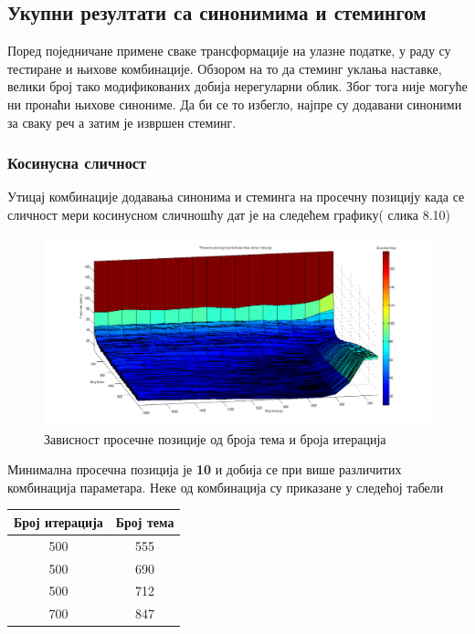 \subsection{Укупни резултати са синонимима и стемингом}

Поред поједничане примене сваке трансформације на улазне податке, у раду су тестиране и њихове комбинације. Обзором на то да стеминг уклања наставке, велики број тако модификованих добија нерегуларни облик. Због тога није могуће ни пронаћи њихове синониме. Да би се то избегло, најпре су додавани синоними за сваку реч а затим је извршен стеминг.

\subsubsection{Косинусна сличност}



Утицај  комбинације додавања синонима и стеминга на просечну позицију  када се сличност мери косинусном сличношћу дат је на следећем графику( слика 8.10)

		\begin{figure}[H]
    \centering
   \includegraphics[scale=0.3]{./Slike/StemmSyn.png} 
	\caption{Зависност просечне позиције од броја тема и броја итерација}
	\label{fig:slika1}
\end{figure}

Минимална просечна позиција је \textbf{10} и добија се при више различитих комбинација параметара. Неке од комбинација су приказане у следећој табели

\begin{center}
\begin{tabular}{|c|c|}
\hline
Број итерација & Број тема \\
\hline\hline
500 & 555 \\
500 & 690 \\
500 & 712 \\
700 & 847 \\
\hline
\end{tabular}
\end{center}

